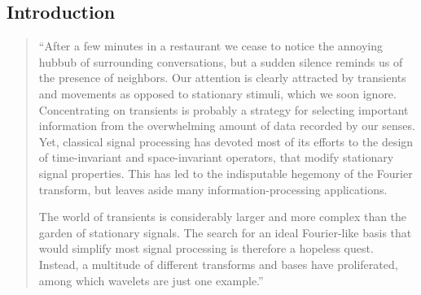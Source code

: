 \subsection{Introduction\protect\footnotemark}
\begin{quote}
``After a few minutes in a restaurant we cease to notice the annoying
hubbub of surrounding conversations, but a sudden silence reminds us
of the presence of neighbors.  Our attention is clearly attracted by
transients and movements as opposed to stationary stimuli, which we
soon ignore.  Concentrating on transients is probably a strategy for
selecting important information from the overwhelming amount of data
recorded by our senses. Yet, classical signal processing has devoted
most of its efforts to the design of time-invariant and
space-invariant operators, that modify stationary signal properties.
This has led to the indisputable hegemony of the Fourier transform,
but leaves aside many information-processing applications.

The world of transients is considerably larger and more complex than
the garden of stationary signals.  The search for an ideal
Fourier-like basis that would simplify most signal processing is
therefore a hopeless quest.  Instead, a multitude of different
transforms and bases have proliferated, among which wavelets are just
one example.''
\end{quote}

                                                                            